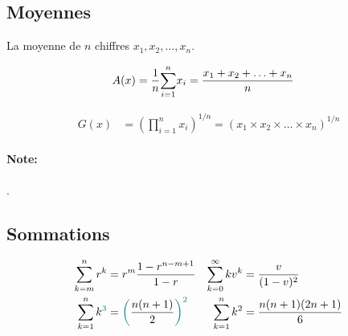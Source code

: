 \documentclass[10pt, french]{article}
\begin{document}
\begin{multicols*}{2}
\begin{center}
\begin{tikzpicture}[x=0.75pt,y=0.75pt,yscale=-1,xscale=1]
\end{tikzpicture}
\end{center}

\subsection*{Moyennes}
La moyenne de $n$ chiffres $x_{1}, x_{2}, \dots, x_{n}$.

\begin{rappel_enhanced}
\begin{align*}
	A(x)
	&=	\frac{1}{n}\sumz{n}{i = 1} x_{i}
	=	\frac{x_{1} + x_{2} + \hdots + x_{n}}{n}
\end{align*}
\end{rappel_enhanced}

\begin{rappel_enhanced}
\begin{align*}
	G(x)
	&=	\left(\prod^{n}_{i = 1} x_{i}\right)^{1/n}
	=	\left(x_{1} \times x_{2} \times \hdots \times x_{n}\right)^{1/n}
\end{align*}
\end{rappel_enhanced}

\paragraph{Note:}	.

\subsection*{Sommations}
\begin{align*}
\sum_{k = m}^{n} r^k &= r^{m} \frac{1 - r^{n - m + 1}}{1 - r} &
\sum_{k = 0}^{\infty}k v^k &= \frac{v}{(1 - v)^2} \\
\sum_{k = 1}^{n}k^{\textcolor{teal}{3}} &= \textcolor{teal}{\bigg(}\frac{n(n + 1)}{2}\textcolor{teal}{\bigg)^{2}} &
\sum_{k = 1}^{n}k^2 &= \frac{n(n + 1)(2n + 1)}{6} \\
\end{align*}


\end{multicols*}
\end{document}
